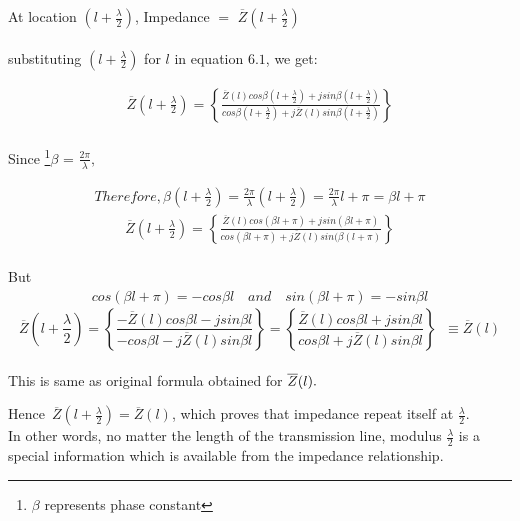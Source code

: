 At location ${(l+\frac{\lambda}{2})}$, Impedance  $=$ $\overline{Z}(l+\frac{\lambda}{2})$\\\\
substituting ${(l+\frac{\lambda}{2})}$ for $l$ in equation $6.1$, we get: 
 
\begin{align*}
\overline{Z}(l+\frac{\lambda}{2}) = \left\lbrace \frac{\overline{Z}(l)cos\beta (l+\frac{\lambda}{2}) + jsin\beta (l+\frac{\lambda}{2})}{cos\beta (l+\frac{\lambda}{2}) + j\overline{Z}(l)sin\beta (l+\frac{\lambda}{2})}\right\rbrace 
\end{align*}\\
 
Since \footnote{$\beta$ represents phase constant}$\beta$ = $ \frac{2\pi}{\lambda},$
 
\begin{align*}
Therefore, \beta(l+\frac{\lambda}{2})=\frac{2\pi}{\lambda}(l+\frac{\lambda}{2})=\frac{2\pi}{\lambda}l+\pi=\beta l+\pi
\end{align*}
\begin{align*}
\overline{Z}(l+\frac{\lambda}{2}) = \left\lbrace \frac{\overline{Z}(l)cos(\beta l+\pi) + jsin(\beta l+\pi)}{cos(\beta l+\pi) + j\overline{Z}(l)sin(\beta (l+\pi)}\right\rbrace 
\end{align*}\\
But 
\begin{align*} 
cos(\beta l+\pi)=-cos\beta l \quad and \quad sin(\beta l+\pi)=-sin\beta l
\end{align*}
\begin{dmath*}
\overline{Z}(l+\frac{\lambda}{2})=\left\lbrace \frac{-\overline{Z}(l)cos\beta l - jsin\beta l}{-cos\beta l - j\overline{Z}(l)sin\beta l}\right\rbrace = \left\lbrace \frac{\overline{Z}(l)cos\beta l + jsin\beta l}{cos\beta l + j\overline{Z}(l)sin\beta l}\right\rbrace\;\;\equiv \overline{Z}(l)
\end{dmath*}\\  
 This is same as original formula obtained for $\overline{Z}(l).\\$
 
Hence\ $\overline{Z}(l+\frac{\lambda}{2})
=\overline{Z}(l)$, which proves that impedance repeat itself at $\frac{\lambda}{2}$.\\
 
 In other words, no matter the length of the transmission line, modulus $\frac{\lambda}{2}$ is  a special information which is available from the impedance relationship.\\
 
